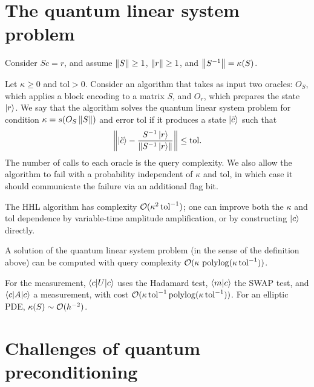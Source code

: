\section{The quantum linear system problem}\label{sec:sec07-qlsp}

Consider $S c = r$, and assume $\left\lVert S \right\rVert \ge 1$, $\left\lVert r \right\rVert \ge 1$, and
$\left\lVert S^{-1} \right\rVert = \kappa(S)$.

\begin{definition}
Let $\kappa \ge 0$ and $\mathrm{tol} > 0$. Consider an algorithm that takes as
input two oracles: $O_S$, which applies a block encoding to a matrix $S$, and
$O_r$, which prepares the state $\ket{r}$. We say that the algorithm solves the
quantum linear system problem for condition $\kappa = s(O_S \left\lVert S \right\rVert)$ and error
$\mathrm{tol}$ if it produces a state $\ket{\tilde{c}}$ such that
\begin{equation}
  \left\lVert \ket{\tilde{c}} - \frac{S^{-1}\ket{r}}{\left\lVert S^{-1}\ket{r} \right\rVert} \right\rVert \le \mathrm{tol}.
\end{equation}
The number of calls to each oracle is the query complexity. We also allow the
algorithm to fail with a probability independent of $\kappa$ and $\mathrm{tol}$, in
which case it should communicate the failure via an additional flag bit.
\end{definition}

The HHL algorithm has complexity $\mathcal{O}(\kappa^2\,\mathrm{tol}^{-1})$; one can
improve both the $\kappa$ and $\mathrm{tol}$ dependence by variable-time amplitude
amplification, or by constructing $\ket{c}$ directly.

\begin{theorem}
A solution of the quantum linear system problem (in the sense of the definition
above) can be computed with query complexity
$\mathcal{O}(\kappa\,\operatorname{polylog}(\kappa\,\mathrm{tol}^{-1}))$.
\end{theorem}

For the measurement, $\braket{c|U|c}$ uses the Hadamard test, $\braket{m|c}$ the
SWAP test, and $\braket{c|A|c}$ a measurement, with cost
$\mathcal{O}(\kappa\,\mathrm{tol}^{-1}\operatorname{polylog}(\kappa\,\mathrm{tol}^{-1}))$. For an
elliptic PDE, $\kappa(S) \sim \mathcal{O}(h^{-2})$.

\section{Challenges of quantum preconditioning}\label{sec:sec07-challenges}

